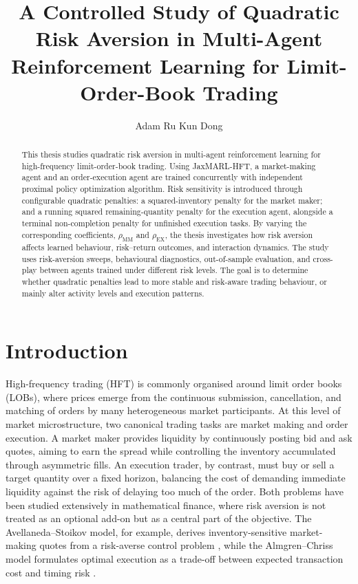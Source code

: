 \documentclass[oneside]{uva-inf-bachelor-thesis}
\title{A Controlled Study of Quadratic Risk Aversion in Multi-Agent Reinforcement Learning for Limit-Order-Book Trading}
\author{Adam Ru Kun Dong}
\begin{document}
\maketitle


\begin{abstract}
This thesis studies quadratic risk aversion in multi-agent reinforcement learning for high-frequency limit-order-book trading. Using JaxMARL-HFT, a market-making agent and an order-execution agent are trained concurrently with independent proximal policy optimization algorithm. Risk sensitivity is introduced through configurable quadratic penalties: a squared-inventory penalty for the market maker; and a running squared remaining-quantity penalty for the execution agent, alongside a terminal non-completion penalty for unfinished execution tasks. By varying the corresponding coefficients, $\rho_{\mathrm{MM}}$ and $\rho_{\mathrm{EX}}$, the thesis investigates how risk aversion affects learned behaviour, risk--return outcomes, and interaction dynamics. The study uses risk-aversion sweeps, behavioural diagnostics, out-of-sample evaluation, and cross-play between agents trained under different risk levels. The goal is to determine whether quadratic penalties lead to more stable and risk-aware trading behaviour, or mainly alter activity levels and execution patterns.
\end{abstract}

\tableofcontents

\chapter{Introduction}

High-frequency trading (HFT) is commonly organised around limit order books (LOBs), where prices emerge from the continuous submission, cancellation, and matching of orders by many heterogeneous market participants. At this level of market microstructure, two canonical trading tasks are market making and order execution. A market maker provides liquidity by continuously posting bid and ask quotes, aiming to earn the spread while controlling the inventory accumulated through asymmetric fills. An execution trader, by contrast, must buy or sell a target quantity over a fixed horizon, balancing the cost of demanding immediate liquidity against the risk of delaying too much of the order. Both problems have been studied extensively in mathematical finance, where risk aversion is not treated as an optional add-on but as a central part of the objective. The Avellaneda--Stoikov model, for example, derives inventory-sensitive market-making quotes from a risk-averse control problem \cite{avellaneda_high-frequency_2008}, while the Almgren--Chriss model formulates optimal execution as a trade-off between expected transaction cost and timing risk \cite{almgren2000}.
\end{document}
